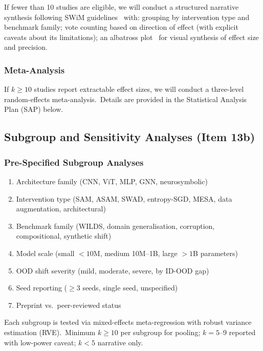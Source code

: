 If fewer than 10 studies are eligible, we will conduct a structured narrative synthesis following SWiM guidelines~\cite{campbell2020swim} with: grouping by intervention type and benchmark family; vote counting based on direction of effect (with explicit caveats about its limitations); an albatross plot~\cite{harrison2017albatross} for visual synthesis of effect size and precision.

\subsubsection{Meta-Analysis}

If $k \geq 10$ studies report extractable effect sizes, we will conduct a three-level random-effects meta-analysis.\ Details are provided in the Statistical Analysis Plan (SAP) below.

\subsection{Subgroup and Sensitivity Analyses (Item 13b)}

\subsubsection{Pre-Specified Subgroup Analyses}

\begin{enumerate}[nosep]
\item Architecture family (CNN, ViT, MLP, GNN, neurosymbolic)
\item Intervention type (SAM, ASAM, SWAD, entropy-SGD, MESA, data augmentation, architectural)
\item Benchmark family (WILDS, domain generalisation, corruption, compositional, synthetic shift)
\item Model scale (small $<10$M, medium 10M--1B, large $>1$B parameters)
\item OOD shift severity (mild, moderate, severe, by ID-OOD gap)
\item Seed reporting ($\geq 3$ seeds, single seed, unspecified)
\item Preprint vs.\ peer-reviewed status
\end{enumerate}

Each subgroup is tested via mixed-effects meta-regression with robust variance estimation (RVE).\ Minimum $k \geq 10$ per subgroup for pooling; $k = 5$--9 reported with low-power caveat; $k < 5$ narrative only.

